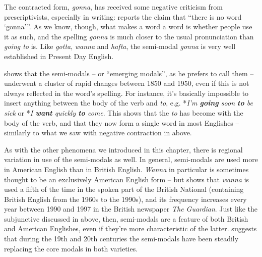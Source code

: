 \noindent The contracted form, \textit{gonna}, has received some negative criticism from prescriptivists, especially in writing: \citet[2]{Lorenz2012} reports the claim that ``there is no word `gonna'{''}. As we know, though, what makes a word a word is whether people use it as such, and the spelling \textit{gonna} is much closer to the usual pronunciation than \textit{going to} is. Like \textit{gotta}, \textit{wanna} and \textit{hafta}, the semi-modal \textit{gonna} is very well established in Present Day English.

\citet{Krug2000} shows that the semi-modals -- or ``emerging modals'', as he prefers to call them -- underwent a cluster of rapid changes between 1850 and 1950, even if this is not always reflected in the word's spelling. For instance, it's basically impossible to insert anything between the body of the verb and \textit{to}, e.g. *\textit{I'm \textbf{going} soon \textbf{to} be sick} or *\textit{I \textbf{want} quickly \textbf{to} come}. This shows that the \textit{to} has become  with the body of the verb, and that they now form a single word in most Englishes -- similarly to what we saw with negative contraction in  above.

As with the other phenomena we introduced in this chapter, there is regional variation in use of the semi-modals as well. In general, semi-modals are used more in American English than in British English. \textit{Wanna} in particular is sometimes thought to be an exclusively American English form -- but \citet[153--155]{Krug2000} shows that \textit{wanna} is used a fifth of the time in the spoken part of the British National  (containing British English from the 1960s to the 1990s), and its frequency increases every year between 1990 and 1997 in the British newspaper \textit{The Guardian}. Just like the subjunctive discussed in  above, then, semi-modals are a feature of both British and American Englishes, even if they're more characteristic of the latter. \citet[8]{Lorenz2012} suggests that during the 19th and 20th centuries the semi-modals have been steadily replacing the core modals in both varieties.

